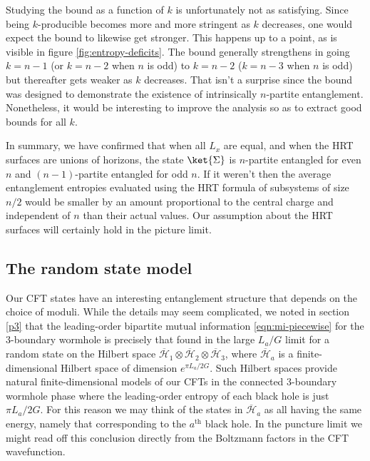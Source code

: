 \documentclass[12pt]{article}
\numberwithin{equation}{section}
\begin{document}
Studying the bound as a function of $k$ is unfortunately not as satisfying. Since being $k$-producible becomes more and more stringent as $k$ decreases, one would expect the bound to likewise get stronger. This happens up to a point, as is visible in figure \ref{fig:entropy-deficits}. The bound generally strengthens in going $k=n-1$ (or $k=n-2$ when $n$ is odd) to $k=n-2$ ($k=n-3$ when $n$ is odd) but thereafter gets weaker as $k$ decreases. That isn't a surprise since the bound was designed to demonstrate the existence of intrinsically $n$-partite entanglement. Nonetheless, it would be interesting to improve the analysis so as to extract good bounds for all $k$.

In summary, we have confirmed that  when all $L_x$ are equal, and when the HRT surfaces are unions of horizons, the state $\ket{\Sigma}$ is $n$-partite entangled for even $n$ and $(n-1)$-partite entangled for odd $n$.  If it weren't then the average entanglement entropies evaluated using the HRT formula of subsystems of size $n/2$  would be smaller by an amount proportional to the central charge and independent of $n$ than their actual values.  Our assumption about the HRT surfaces will certainly hold in the picture limit.

\subsection{The random state model}
\label{random}

Our CFT states have an interesting entanglement structure that depends on the choice of moduli.  While the details may seem complicated, we noted in section \ref{p3} that the leading-order bipartite mutual information \eqref{eqn:mi-piecewise} for the 3-boundary wormhole is precisely that found in the large $L_a/G$ limit for a random state on the Hilbert space $\overline{\mathcal{H}}_1 \otimes \overline{\mathcal{H}}_2 \otimes \overline{\mathcal{H}}_3$, where $\overline{\mathcal{H}}_a$ is a finite-dimensional Hilbert space of dimension $e^{\pi L_a/2G}$.  Such Hilbert spaces provide natural finite-dimensional models of our CFTs in the connected 3-boundary wormhole phase where the leading-order entropy of each black hole is just ${\pi L_a/2G}$.  For this reason we may think of the states  in $\overline{\mathcal{H}}_a$ as all having the same energy, namely that corresponding to the $a^{\text{th}}$ black hole.  In the puncture limit we might read off this conclusion directly from the Boltzmann factors in the CFT wavefunction.
\end{document}
